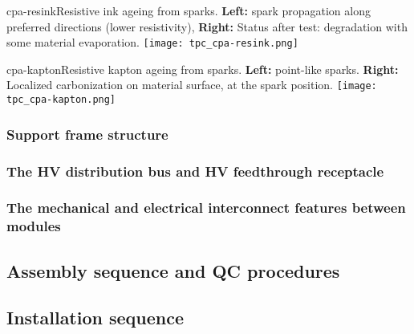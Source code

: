 \begin{cdrfigure}{cpa-resink}{Resistive ink ageing from sparks. 
 {\bf Left:} spark propagation along preferred directions (lower resistivity), {\bf Right:} Status after test: degradation with some material evaporation.} 
\texttt{[image: tpc\_cpa-resink.png]}
\end{cdrfigure}

\begin{cdrfigure}{cpa-kapton}{Resistive kapton ageing from sparks. 
 {\bf Left:} point-like sparks. {\bf Right:} Localized carbonization on material surface, at the spark position.}
\texttt{[image: tpc\_cpa-kapton.png]}
\end{cdrfigure}




\subsubsection{Support frame structure}

\subsubsection{The HV distribution bus and HV feedthrough receptacle }

\subsubsection{The mechanical and electrical interconnect features between modules}

\subsection{Assembly sequence and QC procedures}

\subsection{Installation sequence}




